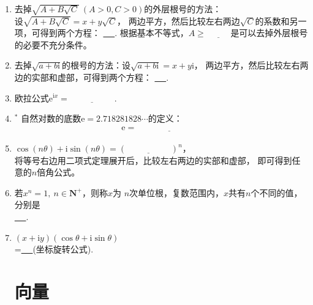 \documentclass{article}
\newif\ifte
\newcommand{\e}{\mathrm{e}}
\renewcommand{\i}{\mathrm{i}}
\renewcommand\geq\geqslant
\begin{document}
\begin{multicols}{2}
\begin{enumerate}[leftmargin=20pt]
\item 去掉$ \sqrt{A+B\sqrt{C}}\ (A>0,C>0) $的外层根号的方法：\\ 
设$ \sqrt{A+B\sqrt{C}}=x+y\sqrt{C} $，
两边平方，然后比较左右两边$ \sqrt{C} $的系数和另一项，可得到两个方程：
\underline{\ \ifte $ A=x^2+y^2C,\ B=2xy $\else \hspace{4cm} \fi\ }.
根据基本不等式，$ A\geq \underline{\ \ifte |B|\sqrt{C}
\else \hspace{1cm} \fi\ } $是可以去掉外层根号的必要不充分条件。

\item 去掉$ \sqrt{a+b\i} $的根号的方法：设$ \sqrt{a+b\i}=x+y\i $，
两边平方，然后比较左右两边的实部和虚部，可得到两个方程：
\underline{\ \ifte $ a=x^2-y^2,\ b=2xy $\else \hspace{4cm} \fi\ }.

\item 欧拉公式$ \e^{\i x}=\underline{\ \ifte 
    \cos x+\i\sin x\else \hspace{2cm} \fi\ } $.

\item $^*$ 自然对数的底数$ \e=2.718281828 \cdots $的定义：
\begin{align*}
    \e=\underline{\ \ifte \lim_{n\to \infty}\left( 1+
       \dfrac{1}{n}\right)^n\else \hspace{3cm} \fi\ }
\end{align*}

\item $ \cos (n\theta)+\i\sin (n\theta)=(\underline{\ \ifte 
 \cos\theta+\i\sin\theta \else \hspace{2cm} \fi\ })^n $，\\
将等号右边用二项式定理展开后，比较左右两边的实部和虚部，
即可得到任意的$ n $倍角公式。

\item 若$ x^n=1,\ n\in \textbf{N}^+ $，则称$ x $为
$ n $次单位根，复数范围内，$ x $共有$ n $个不同的值，分别是 \\
\underline{\ \ifte $ \e^{2k\pi \i/n},\ k=0,1,2,\cdots,n-1 $
    \else \hspace{2cm} \fi\ }.

\item $ (x+\i y)(\cos\theta +\i\sin\theta) $\\
=\underline{\ \ifte $ (x\cos\theta-y\sin\theta)+
\i(x\sin\theta+y\cos\theta) $\else \hspace{5cm} \fi\ }(坐标旋转公式).

\section{向量}


\end{enumerate}
\end{multicols}
\end{document}
